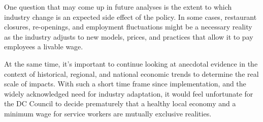 \documentclass[
  14pt,
]{article}
\begin{document}
One question that may come up in future analyses is the extent to which
industry change is an expected side effect of the policy. In some cases,
restaurant closures, re-openings, and employment fluctuations might be a
necessary reality as the industry adjusts to new models, prices, and
practices that allow it to pay employees a livable wage.

At the same time, it's important to continue looking at anecdotal
evidence in the context of historical, regional, and national economic
trends to determine the real scale of impacts. With such a short time
frame since implementation, and the widely acknowledged need for
industry adaptation, it would feel unfortunate for the DC Council to
decide prematurely that a healthy local economy and a minimum wage for
service workers are mutually exclusive realities.
\end{document}
